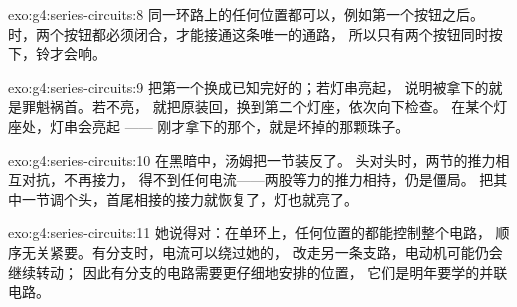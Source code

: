 \begin{solution}{exo:g4:series-circuits:8}
同一环路上的任何位置都可以，例如第一个按钮之后。
时，两个按钮都必须闭合，才能接通这条唯一的通路，
所以只有两个按钮同时按下，铃才会响。
\end{solution}

\begin{solution}{exo:g4:series-circuits:9}
把第一个换成已知完好的；若灯串亮起，
说明被拿下的就是罪魁祸首。若不亮，
就把原装回，换到第二个灯座，依次向下检查。
在某个灯座处，灯串会亮起 ——
刚才拿下的那个，就是坏掉的那颗珠子。
\end{solution}

\begin{solution}{exo:g4:series-circuits:10}
在黑暗中，汤姆把一节装反了。
头对头时，两节的推力相互对抗，不再接力，
得不到任何电流——两股等力的推力相持，仍是僵局。
把其中一节调个头，首尾相接的接力就恢复了，灯也就亮了。
\end{solution}

\begin{solution}{exo:g4:series-circuits:11}
她说得对：在单环上，任何位置的都能控制整个电路，
顺序无关紧要。有分支时，电流可以绕过她的，
改走另一条支路，电动机可能仍会继续转动；
因此有分支的电路需要更仔细地安排的位置，
它们是明年要学的并联电路。
\end{solution}
